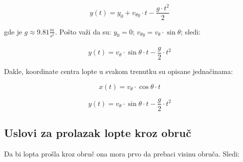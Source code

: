 \documentclass[a4paper, 12pt]{article}
\begin{document}
\[y(t) = y_0 + v_{\theta y} \cdot t - \dfrac{g \cdot t^2}{2}\]

gde je $g \approx 9.81\dfrac{_m}{^{s^2}}$. Pošto važi da su: $y_0 = 0$; $v_{\theta y} = v_\theta \cdot \sin \theta$; sledi:

\[y(t) = v_{\theta} \cdot \sin \theta\cdot t - \dfrac{g}{2} \cdot t^2\]

Dakle, koordinate centra lopte u svakom trenutku su opisane jednačinama:

\[x(t) = v_\theta \cdot \cos \theta \cdot t\]

\[y(t) = v_{\theta} \cdot \sin \theta \cdot t - \dfrac{g}{2} \cdot t^2\]

\subsection{Uslovi za prolazak lopte kroz obruč}

Da bi lopta prošla kroz obruč ona mora prvo da prebaci visinu obruča. Sledi:

\[\]
\end{document}
